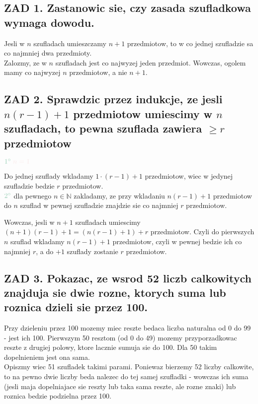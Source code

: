 \documentclass{article}
\newcommand{\N}{\mathbb{N}}
\begin{document}
\pagecolor{back}\color{txt}\ttfamily
\subsection*{ZAD 1. Zastanowic sie, czy zasada szufladkowa wymaga dowodu.}
  Jesli w $n$ szufladach umieszczamy $n+1$ przedmiotow, to w co jednej szufladzie sa co najmniej dwa przedmioty.\\
  Zalozmy, ze w $n$ szufladach jest co najwyzej jeden przedmiot. Wowczas, ogolem mamy co najwyzej $n$ przedmiotow, a nie $n+1$.
\subsection*{\color{tit}ZAD 2. Sprawdzic przez indukcje, ze jesli $n(r-1)+1$ przedmiotow umiescimy w $n$ szufladach, to pewna szuflada zawiera $\geq r$ przedmiotow}
  $\color{emp}1^{\circ}\color{txt}\;n = 1$\smallskip\par
  Do jednej szuflady wkladamy $1\cdot(r-1)+1$ przedmiotow, wiec w jedynej szufladzie bedzie $r$ przedmiotow.\medskip\\
  $\color{emp}2^{\circ}\color{txt}$ dla pewnego $n\in\N$ zakladamy, ze przy wkladaniu $n(r-1)+1$ przedmiotow do $n$ szuflad w pewnej szufladzie znajdzie sie co najmniej $r$ przedmiotow.\smallskip\par
  Wowczas, jesli w $n+1$ szufladach umiescimy $(n+1)(r-1)+1=(n(r-1)+1)+r$ przedmiotow. Czyli do pierwszych $n$ szuflad wkladamy $n(r-1)+1$ przedmiotow, czyli w pewnej bedzie ich co najmniej $r$, a do $+1$ szuflady zostanie $r$ przedmiotow.
\subsection*{\color{tit}ZAD 3. Pokazac, ze wsrod 52 liczb calkowitych znajduja sie dwie rozne, ktorych suma lub roznica dzieli sie przez 100.}
  Przy dzieleniu przez 100 mozemy miec reszte bedaca liczba naturalna od 0 do 99 - jest ich 100. Pierwszym 50 resztom (od 0 do 49) mozemy przyporzadkowac reszte z drugiej polowy, ktore lacznie sumuja sie do 100. Dla 50 takim dopelnieniem jest ona sama. \\
  Opiszmy wiec 51 szufladek takimi parami. Poniewaz bierzemy 52 liczby calkowite, to na pewno dwie liczby beda nalezec do tej samej szufladki - wowczas ich suma (jesli maja dopelniajace sie reszty lub taka sama reszte, ale rozne znaki) lub roznica bedzie podzielna przez 100.
\end{document}
